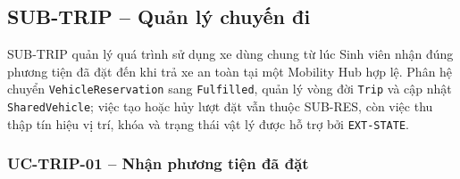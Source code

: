 \subsection{SUB-TRIP -- Quản lý chuyến đi}

SUB-TRIP quản lý quá trình sử dụng xe dùng chung từ lúc Sinh viên nhận đúng phương tiện đã đặt đến khi trả xe an toàn tại một Mobility Hub hợp lệ. Phân hệ chuyển \texttt{VehicleReservation} sang \texttt{Fulfilled}, quản lý vòng đời \texttt{Trip} và cập nhật \texttt{SharedVehicle}; việc tạo hoặc hủy lượt đặt vẫn thuộc SUB-RES, còn việc thu thập tín hiệu vị trí, khóa và trạng thái vật lý được hỗ trợ bởi \texttt{EXT-STATE}.

\subsubsection{UC-TRIP-01 -- Nhận phương tiện đã đặt}


